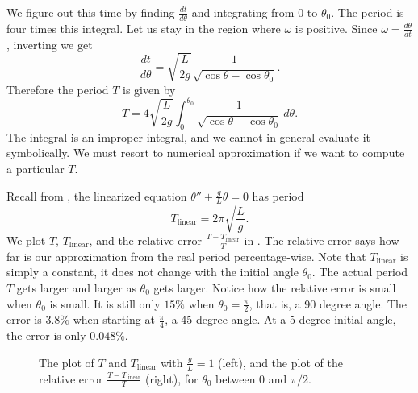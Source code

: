 \documentclass[12pt]{book}
\begin{document}
We figure out this time by finding
$\frac{dt}{d\theta}$ and integrating from $0$ to $\theta_0$.
The period is four times
this integral.  Let us stay in the region where $\omega$ is positive.
Since $\omega = \frac{d\theta}{dt}$, inverting we get
\begin{equation*}
\frac{dt}{d\theta} = \sqrt{\frac{L}{2g}} \frac{1}{\sqrt{\cos \theta - \cos \theta_0 }} .
\end{equation*}
Therefore the period $T$ is given by
\begin{equation*}
T = 4 \sqrt{\frac{L}{2g}} \int_0^{\theta_0} \frac{1}{\sqrt{\cos \theta -
\cos \theta_0 }}\, d\theta .
\end{equation*}
The integral is an improper integral, and we cannot in
general evaluate it symbolically.  We must resort to numerical
approximation if we want to compute a particular $T$.

Recall from , the linearized equation $\theta''+\frac{g}{L}\theta
= 0$ has period
\begin{equation*}
T_{\text{linear}} = 2\pi \sqrt{\frac{L}{g}} .
\end{equation*}
We plot $T$, $T_{\text{linear}}$, and the relative error
$\frac{T-T_{\text{linear}}}{T}$ in .  The relative error
says how far is our approximation from the real period percentage-wise.
Note that $T_{\text{linear}}$ is simply a constant, it does not change with
the initial angle $\theta_0$.  The actual period $T$ gets larger and larger as
$\theta_0$ gets larger.
Notice how the relative error is small when $\theta_0$ is small.  It is
still only $15\%$ when $\theta_0 = \frac{\pi}{2}$, that is, a 90 degree
angle.  The error is $3.8\%$ when starting at $\frac{\pi}{4}$, 
a 45 degree angle.  At a 5 degree initial angle, the error is only $0.048 \%$.

\begin{figure}[h!t]
\capstart
\begin{center}
\caption{The plot of $T$ and $T_{\text{linear}}$ with $\frac{g}{L} =
1$ (left), and the plot of the relative
error $\frac{T-T_{\text{linear}}}{T}$ (right), for $\theta_0$ between 0 and $\pi/2$. \label{fig:TvsT0}}
\end{center}
\end{figure}
\end{document}
